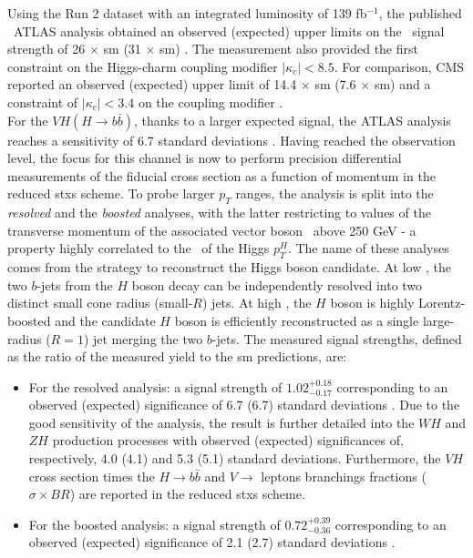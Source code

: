 Using the Run 2 dataset with an integrated luminosity of 139 fb$^{-1}$, the published \vhc\ ATLAS analysis obtained an observed (expected) upper limits on the \vhc\ signal strength of 26 $\times$ \gls{sm} (31 $\times$ \gls{sm}) \cite{Collaboration:2721696}. The measurement also provided the first constraint on the Higgs-charm coupling modifier $|\kappa_c| < 8.5$. For comparison, CMS reported an observed (expected) upper limit of 14.4 $\times$ \gls{sm} (7.6 $\times$ \gls{sm}) and a constraint of $|\kappa_c| < 3.4 $ on the coupling modifier \cite{arXiv:2205.05550}. \\ 

For the $VH (H\rightarrow b\bar{b})$, thanks to a larger expected signal, the ATLAS analysis reaches a sensitivity of 6.7 standard deviations \cite{ATLAS:2020fcp}. Having reached the observation level, the focus for this channel is now to perform precision differential measurements of the fiducial cross section as a function of momentum in the reduced \gls{stxs} scheme. To probe larger $p_T$ ranges, the analysis is split into the \textit{resolved} \cite{ATLAS:2020fcp} and the \textit{boosted} \cite{ATLAS:2020jwz} analyses, with the latter restricting to values of the transverse momentum of the associated vector boson \ptv\ above 250 GeV - a property highly correlated to the \pt\ of the Higgs $p_T^H$. The name of these analyses comes from the strategy to reconstruct the Higgs boson candidate. At low \ptv, the two $b$-jets from the $H$ boson decay can be independently resolved into two distinct small cone radius (small-$R$) jets. At high \ptv, the $H$ boson is highly Lorentz-boosted and the candidate $H$ boson is efficiently reconstructed as a single large-radius ($R = 1$) jet merging the two $b$-jets. The measured signal strengths, defined as the ratio of the measured yield to the \gls{sm} predictions, are: 
\begin{itemize}
\item For the resolved analysis: a signal strength of $1.02_{-0.17}^{+0.18}$ corresponding to an observed (expected) significance of 6.7 (6.7) standard deviations \cite{ATLAS:2020fcp}. Due to the good sensitivity of the analysis, the result is further detailed into the $WH$ and $ZH$ production processes with observed (expected) significances of, respectively, 4.0 (4.1) and 5.3 (5.1) standard deviations. Furthermore, the $VH$ cross section times the $H \rightarrow b\bar{b}$ and $V\rightarrow$ leptons branchings fractions ($\sigma \times BR$) are reported in the reduced \gls{stxs} scheme.
\item For the boosted analysis: a signal strength of  $0.72_{-0.36}^{+0.39}$ corresponding to an observed (expected) significance of 2.1 (2.7) standard deviations \cite{ATLAS:2020jwz}.
\end{itemize}

